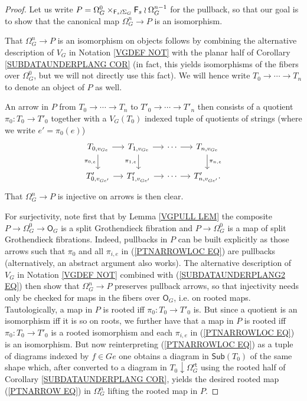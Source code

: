 \documentclass[a4paper,10pt]{article}%
\begin{document}
\begin{proof}
Let us write 
$P = \Omega_{G}^{0} \times_{\mathsf{F}_s \wr \Sigma_G} \mathsf{F}_s \wr \Omega_{G}^{n-1}$ for the pullback,
so that our goal is to show that the canonical map
$\Omega_{G}^{n} \to P$ is an isomorphism. 

That $\Omega_{G}^{n} \to P$ is an isomorphism on objects 
follows by combining the alternative description of $V_G$
in Notation \ref{VGDEF NOT} with the planar half of
Corollary \ref{SUBDATAUNDERPLANG COR}
(in fact, this yields isomorphisms of the fibers over 
$\Omega_{G}^{0}$, but we will not directly use this fact).
We will hence write $T_0 \to \cdots \to T_n$
to denote an object of $P$ as well.

An arrow in $P$ from 
$T_0 \to \cdots \to T_n$ to 
$T'_0 \to \cdots \to T'_n$
then consists of a quotient 
$\pi_0 \colon T_0 \to T'_0$
together with a $V_G(T_0)$ indexed tuple of quotients of strings (where we write $e'=\pi_0(e)$)
\begin{equation} \label{PTNARROWLOC EQ}
\begin{tikzcd}[column sep=1.2em]
	T_{0,v_{G e}} \ar{r}{} \ar{d}[swap]{\pi_{0,e}} & 
	T_{1,v_{G e}} \ar{r}{} \ar{d}[swap]{\pi_{1,e}} &
	\cdots \ar{r}{} &
	T_{n,v_{G e}} \ar{d}{\pi_{n,e}}
\\
	T'_{0,v_{G e'}} \ar{r}{} &
	T'_{1,v_{G e'}} \ar{r}{} &
	\cdots \ar{r}{} &
	T'_{n,v_{G e'}}.
\end{tikzcd}	
\end{equation}
That $\Omega_{G}^{n} \to P$ is injective on arrows is then clear.

For surjectivity, note first that by Lemma \ref{VGPULL LEM} the composite $P \to \Omega_{G}^{0} \to \mathsf{O}_G$
is a split Grothendieck fibration and 
$P \to \Omega_{G}^{0}$ is a map of split Grothendieck fibrations. 
Indeed, pullbacks in $P$ can be built explicitly as those arrows such that $\pi_0$ and all $\pi_{i,e}$ in 
(\ref{PTNARROWLOC EQ})
are pullbacks (alternatively, an abstract argument also works).
The alternative description of $V_G$ in 
Notation \ref{VGDEF NOT} combined with
(\ref{SUBDATAUNDERPLANG2 EQ}) 
then show that 
$\Omega_{G}^{n} \to P$ preserves pullback arrows,
so that injectivity needs only be checked for maps in the fibers over $\mathsf{O}_G$, i.e. on rooted maps.
Tautologically, a map in $P$ is rooted iff $\pi_0 \colon T_0 \to T'_0$ is.
But since a quotient is an isomorphism iff it is so on roots,
we further have that 
a map in $P$ is rooted iff $\pi_0 \colon T_0 \to T'_0$
is a rooted isomorphism and
each $\pi_{i,e}$ in (\ref{PTNARROWLOC EQ}) is an isomorphism.
But now reinterpreting (\ref{PTNARROWLOC EQ}) as a tuple of diagrams indexed by
$f \in G e$
one obtains a diagram in $\mathsf{Sub}(T_0)$ of the same shape  which, after converted to a diagram in 
$T_0 \downarrow \Omega_G^{\mathsf{rt}}$
using the rooted half of Corollary \ref{SUBDATAUNDERPLANG COR},
yields the desired rooted map (\ref{PTNARROW EQ})
in $\Omega_{G}^{n}$ lifting the rooted map in $P$.
\end{proof}
\end{document}
